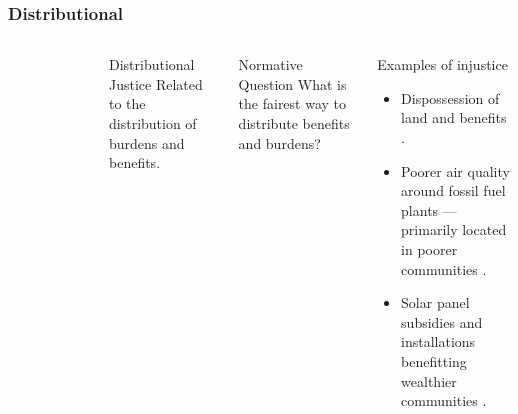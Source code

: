 \begin{frame}
    \frametitle{Distributional}
    \begin{columns}
        \column[t]{3cm}
        \begin{figure}
            \centering
        \end{figure}
        \column[t]{7cm}
        \begin{block}{Distributional Justice}
            Related to the distribution of burdens and benefits.
        \end{block}
        \begin{block}{Normative Question}
            What is the fairest way to distribute benefits and burdens?
        \end{block}
        \begin{block}{Examples of injustice}
            \begin{itemize}
                \item Dispossession of land and benefits
                \cite{yenneti_spatial_2016,sovacool_dispossessed_2021}. 
                \item Poorer air quality around fossil fuel plants --- primarily
                located in poorer communities \cite{mohai_which_2015}.
                \item Solar panel subsidies and installations benefitting
                wealthier communities \cite{reames_distributional_2020}.
            \end{itemize}
        \end{block}
    \end{columns}
    
\end{frame}

